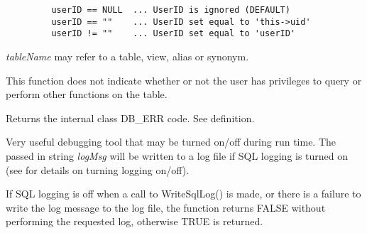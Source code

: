 \begin{verbatim}
         userID == NULL  ... UserID is ignored (DEFAULT)
         userID == ""    ... UserID set equal to 'this->uid'
         userID != ""    ... UserID set equal to 'userID'
\end{verbatim}


{\it tableName} may refer to a table, view, alias or synonym.

This function does not indicate whether or not the user has privileges to query or perform other functions on the table.

\label{wxdbtranslatesqlstate}





Returns the internal class DB_ERR code.  See  definition.

\label{wxdbwritesqllog}





Very useful debugging tool that may be turned on/off during run time.  The
passed in string {\it logMsg} will be written to a log file if SQL logging
is turned on (see  for details on turning logging on/off).


If SQL logging is off when a call to WriteSqlLog() is made, or there is a
failure to write the log message to the log file, the function returns
FALSE without performing the requested log, otherwise TRUE is returned.



\label{wxdbisfwdonlycursors}


